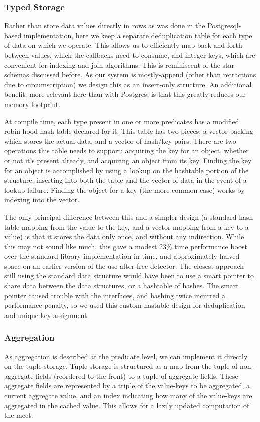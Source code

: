\subsubsection{Typed Storage}
Rather than store data values directly in rows as was done in the Postgresql-based implementation, here we keep a separate deduplication table for each type of data on which we operate.
This allows us to efficiently map back and forth between values, which the callbacks need to consume, and integer keys, which are convenient for indexing and join algorithms. 
This is reminiscent of the star schemas discussed before.
As our system is mostly-append (other than retractions due to circumscription) we design this as an insert-only structure.
An additional benefit, more relevant here than with Postgres, is that this greatly reduces our memory footprint.

At compile time, each type present in one or more predicates has a modified robin-hood hash table declared for it.
This table has two pieces: a vector backing which stores the actual data, and a vector of hash/key pairs.
There are two operations this table needs to support: acquiring the key for an object, whether or not it's present already, and acquiring an object from its key.
Finding the key for an object is accomplished by using a lookup on the hashtable portion of the structure, inserting into both the table and the vector of data in the event of a lookup failure.
Finding the object for a key (the more common case) works by indexing into the vector.

The only principal difference between this and a simpler design (a standard hash table mapping from the value to the key, and a vector mapping from a key to a value) is that it stores the data only once, and without any indirection.
While this may not sound like much, this gave a modest 23\% time performance boost over the standard library implementation in time, and approximately halved space on an earlier version of the use-after-free detector.
The closest approach still using the standard data structure would have been to use a smart pointer to share data between the data structures, or a hashtable of hashes.
The smart pointer caused trouble with the interfaces, and hashing twice incurred a performance penalty, so we used this custom hastable design for deduplication and unique key assignment.

\subsubsection{Aggregation}
As aggregation is described at the predicate level, we can implement it directly on the tuple storage.
Tuple storage is structured as a map from the tuple of non-aggregate fields (reordered to the front) to a tuple of aggregate fields.
These aggregate fields are represented by a triple of the value-keys to be aggregated, a current aggregate value, and an index indicating how many of the value-keys are aggregated in the cached value.
This allows for a lazily updated computation of the meet.

